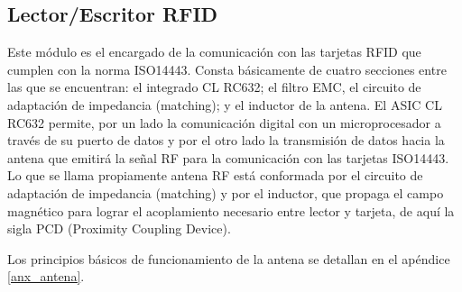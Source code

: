 \newpage
\subsection{Lector/Escritor RFID}
Este módulo es el encargado de la comunicación con las tarjetas RFID que cumplen con la norma ISO14443. Consta básicamente de cuatro secciones entre las que se encuentran: el integrado CL RC632; el filtro EMC, el circuito de adaptación de impedancia (matching); y el inductor de la antena. 
El ASIC CL RC632 permite, por un lado la comunicación digital con un microprocesador a través de su puerto de datos y por el otro lado la transmisión de datos hacia la antena que emitirá la señal RF para la comunicación con las tarjetas ISO14443. 
Lo que se llama propiamente antena RF está conformada por el circuito de adaptación de impedancia (matching) y por el inductor, que propaga el campo magnético para lograr el acoplamiento necesario entre lector y tarjeta, de aquí la sigla PCD (Proximity Coupling Device).

Los principios básicos de funcionamiento de la antena se detallan en el apéndice \ref{anx_antena}.

